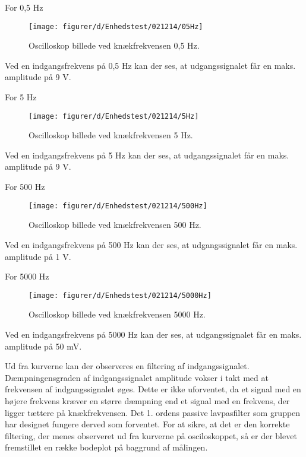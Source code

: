 For 0,5 Hz

\begin{figure}[H]
    \centering
    \texttt{[image: figurer/d/Enhedstest/021214/05Hz]}
    \caption{Oscilloskop billede ved knækfrekvensen 0,5 Hz.}
    \label{figtest_50Hz}
\end{figure}

Ved en indgangsfrekvens på 0,5 Hz kan der ses, at udgangssignalet får en maks. amplitude på 9 V.

For 5 Hz

\begin{figure}[H]
    \centering
    \texttt{[image: figurer/d/Enhedstest/021214/5Hz]}
    \caption{Oscilloskop billede ved knækfrekvensen 5 Hz.}
    \label{figtest_50Hz}
\end{figure}

Ved en indgangsfrekvens på 5 Hz kan der ses, at udgangssignalet får en maks. amplitude på 9 V.

For 500 Hz

\begin{figure}[H]
    \centering
    \texttt{[image: figurer/d/Enhedstest/021214/500Hz]}
    \caption{Oscilloskop billede ved knækfrekvensen 500 Hz.}
    \label{figtest_50Hz}
\end{figure}

Ved en indgangsfrekvens på 500 Hz kan der ses, at udgangssignalet får en maks. amplitude på 1 V.

For 5000 Hz

\begin{figure}[H]
    \centering
    \texttt{[image: figurer/d/Enhedstest/021214/5000Hz]}
    \caption{Oscilloskop billede ved knækfrekvensen 5000 Hz.}
    \label{figtest_50Hz}
\end{figure}

Ved en indgangsfrekvens på 5000 Hz kan der ses, at udgangssignalet får en maks. amplitude på 50 mV.

Ud fra kurverne kan der observeres en filtering af indgangssignalet. 
Dæmpningensgraden af indgangssignalet amplitude vokser i takt med at frekvensen af indgangssignalet øges. 
Dette er ikke uforventet, da et signal med en højere frekvens kræver en større dæmpning end et signal med en frekvens, der ligger tættere på knækfrekvensen. 
Det 1. ordens passive lavpasfilter som gruppen har designet fungere derved som forventet. 
For at sikre, at det er den korrekte filtering, der menes observeret ud fra kurverne på osciloskoppet, så er der blevet fremstillet en række bodeplot på baggrund af målingen.

